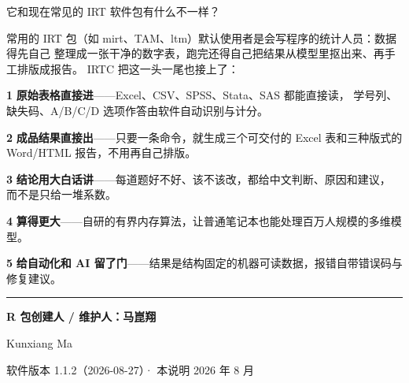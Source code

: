 \documentclass[11pt, oneside]{book}
\begin{document}
\vspace{0.75cm}
{\HeadFont\fontsize{12.5}{17}\selectfont\color{white}%
 它和现在常见的 IRT 软件包有什么不一样？}\par
\vspace{0.35cm}
{\LightFont\fontsize{10}{16}\selectfont\color{white}
常用的 IRT 包（如 mirt、TAM、ltm）默认使用者是会写程序的统计人员：数据得先自己
整理成一张干净的数字表，跑完还得自己把结果从模型里抠出来、再手工排版成报告。
IRTC 把这一头一尾也接上了：\par
\vspace{0.34cm}
\hspace{0.2cm}\textcolor{IRTCgoldsoft}{\textbf{1}}\quad
\textbf{原始表格直接进}——Excel、CSV、SPSS、Stata、SAS 都能直接读，
学号列、缺失码、A/B/C/D 选项作答由软件自动识别与计分。\par
\vspace{0.16cm}
\hspace{0.2cm}\textcolor{IRTCgoldsoft}{\textbf{2}}\quad
\textbf{成品结果直接出}——只要一条命令，就生成三个可交付的 Excel 表和三种版式的
Word/HTML 报告，不用再自己排版。\par
\vspace{0.16cm}
\hspace{0.2cm}\textcolor{IRTCgoldsoft}{\textbf{3}}\quad
\textbf{结论用大白话讲}——每道题好不好、该不该改，都给中文判断、原因和建议，
而不是只给一堆系数。\par
\vspace{0.16cm}
\hspace{0.2cm}\textcolor{IRTCgoldsoft}{\textbf{4}}\quad
\textbf{算得更大}——自研的有界内存算法，让普通笔记本也能处理百万人规模的多维模型。\par
\vspace{0.16cm}
\hspace{0.2cm}\textcolor{IRTCgoldsoft}{\textbf{5}}\quad
\textbf{给自动化和 AI 留了门}——结果是结构固定的机器可读数据，报错自带错误码与修复建议。\par}

\vfill

{\color{white!35}\rule{5.5cm}{0.5pt}}\par
\vspace{0.38cm}
{\LightFont\fontsize{12}{19}\selectfont\color{white}%
 \textbf{R 包创建人 / 维护人：马崑翔}\par}
{\LightFont\fontsize{10.5}{17}\selectfont\color{IRTCgoldsoft}%
 Kunxiang Ma\par}
\vspace{0.4cm}
{\LightFont\fontsize{10.5}{16}\selectfont\color{white}%
 软件版本 1.1.2（2026-08-27）\quad · \quad 本说明 2026 年 8 月\par}
\vspace{0.7cm}
\end{document}
